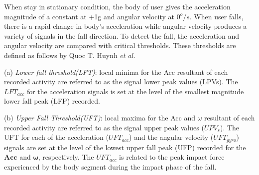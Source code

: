 \documentclass[letterpaper,12pt,titlepage,oneside,final]{book}
\begin{document}
When stay in stationary condition, the body of user gives the acceleration magnitude of a constant at +1g and angular velocity at $0^{o}/s$. When user falls, there is a rapid change in body's acceleration while angular velocity produces a variety of signals in the fall direction. To detect the fall, the acceleration and angular velocity are compared with critical thresholds. These thresholds are defined as follows by Quoc T. Huynh \textit{et al.} \par 
\vspace{1cm}
{\addtolength{\leftskip}{2cm}
(a) \textit{Lower fall threshold(LFT)}: local minima for the Acc
resultant of each recorded activity are referred to
as the signal lower peak values (LPVs). The $LFT_{acc}$
for the acceleration signals is set at the level of the
smallest magnitude lower fall peak (LFP) recorded.\par
}
{\addtolength{\leftskip}{2cm}
	(b) \textit{Upper Fall Threshold(UFT)}: local maxima for the Acc and $\omega$
	resultant of each recorded activity are referred to as
	the signal upper peak values ($UPV_{s}$). The UFT for
	each of the acceleration ($UFT_{acc}$) and the angular
	velocity ($UFT_{gyro}$) signals are set at the level of the
	lowest upper fall peak (UFP) recorded for the $\boldsymbol{Acc}$
	and $\boldsymbol{\omega}$, respectively. The $UFT_{acc}$ is related to the peak
	impact force experienced by the body segment during
	the impact phase of the fall.\par
}
\end{document}
